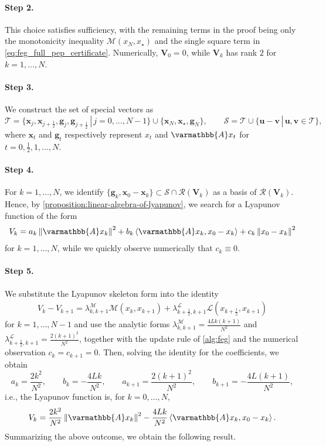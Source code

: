 \documentclass{article}
\theoremstyle{definition}
\theoremstyle{plain}
\newcommand{\vg}{{\mathbf{g}}}
\newcommand{\vu}{{\mathbf{u}}}
\newcommand{\vv}{{\mathbf{v}}}
\newcommand{\vx}{{\mathbf{x}}}
\newcommand{\vV}{{\mathbf{V}}}
\newcommand{\cL}{{\mathcal{L}}}
\newcommand{\cM}{{\mathcal{M}}}
\newcommand{\cR}{{\mathcal{R}}}
\newcommand{\cS}{{\mathcal{S}}}
\newcommand{\cT}{{\mathcal{T}}}
\newcommand{\opA}{{\varmathbb{A}}}
\newcommand{\inprod}[2]{\left\langle #1,#2 \right\rangle}
\newcommand{\sqnorm}[1]{\left\| #1 \right\|^2}
\begin{document}
\paragraph{Step 2.}
This choice satisfies sufficiency, with the remaining terms in the proof being only the monotonicity inequality $\cM(x_N,x_\star)$ and the single square term in \eqref{eq:feg_full_pep_certificate}.
Numerically, $\vV_0=0$, while $\vV_k$ has rank $2$ for $k=1,\dots,N$.

\paragraph{Step 3.}
We construct the set of special vectors as
\[
    \cT=\{\vx_j,\vx_{j+\frac12},\vg_j,\vg_{j+\frac12} \,|\, j=0,\dots,N-1\}
    \cup\{\vx_N,\vx_\star,\vg_N\},
    \qquad
    \cS=\cT\cup\{\vu-\vv \,|\, \vu,\vv\in\cT\},
\]
where $\vx_t$ and $\vg_t$ respectively represent $x_t$ and $\opA x_t$ for $t=0,\frac{1}{2},1,\dots,N$.

\paragraph{Step 4.}
For $k=1,\dots,N$, we identify $\{\vg_k,\vx_0-\vx_k\}\subset \cS\cap\cR(\vV_k)$ as a basis of $\cR(\vV_k)$.
Hence, by \cref{proposition:linear-algebra-of-lyapunov}, we search for a Lyapunov function of the form
\begin{align*}
    V_k
    =
    a_k\sqnorm{\opA x_k}
    +b_k\inprod{\opA x_k}{x_0-x_k}
    +c_k\sqnorm{x_0-x_k}
\end{align*}
for $k=1,\dots,N$, while we quickly observe numerically that $c_k \equiv 0$.

\paragraph{Step 5.}
We substitute the Lyapunov skeleton form into the identity
\begin{align*}
    V_k-V_{k+1}
    =
    \lambda^\cM_{k,k+1}\cM(x_k,x_{k+1})
    +\lambda^\cL_{k+\frac12,k+1}\cL(x_{k+\frac12},x_{k+1})
\end{align*}
for $k=1,\dots,N-1$ and use the analytic forms $\lambda^\cM_{k,k+1} = \frac{4Lk(k+1)}{N^2}$ and $\lambda^\cL_{k+\frac12,k+1} = \frac{2(k+1)^2}{N^2}$, together with the update rule of \ref{alg:feg} and the numerical observation $c_k=c_{k+1}=0$.
Then, solving the identity for the coefficients, we obtain
\[
    a_k=\frac{2k^2}{N^2},
    \qquad
    b_k=-\frac{4Lk}{N^2},
    \qquad
    a_{k+1}=\frac{2(k+1)^2}{N^2},
    \qquad
    b_{k+1}=-\frac{4L(k+1)}{N^2},
\]
i.e., the Lyapunov function is, for $k=0,\dots,N$,
\begin{align}
\label{eqn:feg-lyapunov}
    V_k=\frac{2k^2}{N^2}\sqnorm{\opA x_k}
    -\frac{4Lk}{N^2}\inprod{\opA x_k}{x_0-x_k} .
\end{align}
Summarizing the above outcome, we obtain the following result.
\end{document}
